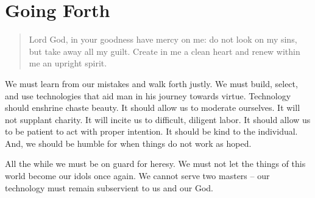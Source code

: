 \documentclass[letterpaper]{article}
\begin{document}
\section{Going Forth}

  \begin{quote}
    Lord God, in your goodness have mercy on me: do not look on my sins, but take away all my guilt. Create in me a clean heart and renew within me an upright spirit.
  \end{quote}

  We must learn from our mistakes and walk forth justly. We must build, select, and use technologies that aid man in his journey towards virtue. Technology should enshrine chaste beauty. It should allow us to moderate ourselves. It will not supplant charity. It will incite us to difficult, diligent labor. It should allow us to be patient to act with proper intention. It should be kind to the individual. And, we should be humble for when things do not work as hoped.

  All the while we must be on guard for heresy. We must not let the things of this world become our idols once again. We cannot serve two masters -- our technology must remain subservient to us and our God.
\end{document}
